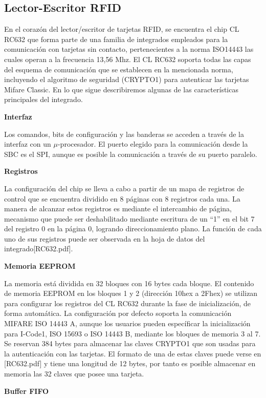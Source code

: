\subsection{Lector-Escritor RFID}
En el corazón del lector/escritor de tarjetas RFID, se encuentra el chip CL RC632 que forma parte de una familia de integrados empleados para la comunicación con tarjetas sin contacto, pertenecientes a la norma ISO14443 las cuales operan a la frecuencia 13,56 Mhz.
El CL RC632 soporta todas las capas del esquema de comunicación que se establecen en la mencionada norma, incluyendo el algoritmo de seguridad (CRYPTO1) para autenticar las tarjetas Mifare Classic. En lo que sigue describiremos algunas de las características principales del integrado.

{\bf{Interfaz}}

Los comandos, bits de configuración y las banderas se acceden a través de la interfaz con un $\mu$-procesador. El puerto elegido para la comunicación desde la SBC es el SPI, aunque es posible la comunicación a través de su puerto paralelo. 

{\bf{Registros}}

La configuración del chip se lleva a cabo a partir de un mapa de registros de control que se encuentra dividido en 8 páginas con 8 registros cada una. La manera de alcanzar estos registros es mediante el intercambio de página, mecanismo que puede ser deshabilitado mediante escritura de un “1” en el bit 7 del registro 0 en la página 0, logrando direccionamiento plano. La función de cada uno de sus registros puede ser observada en la hoja de datos del integrado[RC632.pdf].

{\bf{Memoria EEPROM}}

La memoria está dividida en 32 bloques con 16 bytes cada bloque.
El contenido de memoria EEPROM en los bloques 1 y 2 (dirección 10hex a 2Fhex) se utilizan para configurar los registros del CL RC632 durante la fase de inicialización, de forma automática.
La configuración por defecto soporta la comunicación MIFARE ISO 14443 A, aunque los usuarios pueden específicar la inicialización para I-Code1, ISO 15693 o ISO 14443 B, mediante los bloques de memoria 3 al 7.
Se reservan 384 bytes para almacenar las claves CRYPTO1 que son usadas para la autenticación con las tarjetas. El formato de una de estas claves puede verse en [RC632.pdf] y tiene una longitud de 12 bytes, por tanto es posible almacenar en memoria las 32 claves que posee una tarjeta.


{\bf{Buffer FIFO}}

